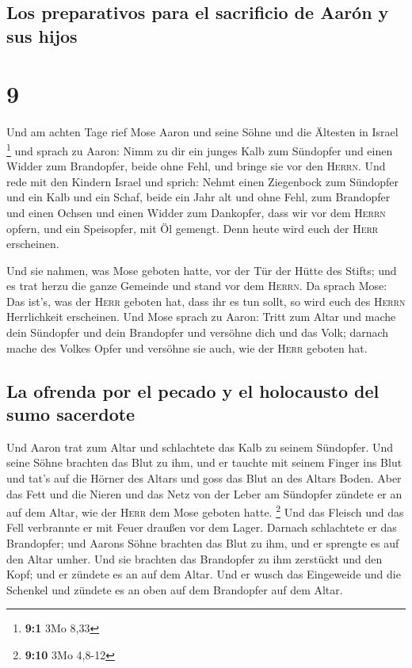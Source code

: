 \hypertarget{los-preparativos-para-el-sacrificio-de-aaruxf3n-y-sus-hijos}{%
\subsection{Los preparativos para el sacrificio de Aarón y sus
hijos}\label{los-preparativos-para-el-sacrificio-de-aaruxf3n-y-sus-hijos}}

\hypertarget{section-8}{%
\section{9}\label{section-8}}

 Und am achten Tage rief Mose Aaron und seine Söhne und
die Ältesten in Israel \footnote{\textbf{9:1} 3Mo 8,33} 
und sprach zu Aaron: Nimm zu dir ein junges Kalb zum Sündopfer und einen
Widder zum Brandopfer, beide ohne Fehl, und bringe sie vor den
\textsc{Herrn}.  Und rede mit den Kindern Israel und
sprich: Nehmt einen Ziegenbock zum Sündopfer und ein Kalb und ein Schaf,
beide ein Jahr alt und ohne Fehl, zum Brandopfer  und
einen Ochsen und einen Widder zum Dankopfer, dass wir vor dem
\textsc{Herrn} opfern, und ein Speisopfer, mit Öl gemengt. Denn heute
wird euch der \textsc{Herr} erscheinen.

 Und sie nahmen, was Mose geboten hatte, vor der Tür der
Hütte des Stifts; und es trat herzu die ganze Gemeinde und stand vor dem
\textsc{Herrn}.  Da sprach Mose: Das ist's, was der
\textsc{Herr} geboten hat, dass ihr es tun sollt, so wird euch des
\textsc{Herrn} Herrlichkeit erscheinen.  Und Mose sprach
zu Aaron: Tritt zum Altar und mache dein Sündopfer und dein Brandopfer
und versöhne dich und das Volk; darnach mache des Volkes Opfer und
versöhne sie auch, wie der \textsc{Herr} geboten hat.

\hypertarget{la-ofrenda-por-el-pecado-y-el-holocausto-del-sumo-sacerdote}{%
\subsection{La ofrenda por el pecado y el holocausto del sumo
sacerdote}\label{la-ofrenda-por-el-pecado-y-el-holocausto-del-sumo-sacerdote}}

 Und Aaron trat zum Altar und schlachtete das Kalb zu
seinem Sündopfer.  Und seine Söhne brachten das Blut zu
ihm, und er tauchte mit seinem Finger ins Blut und tat's auf die Hörner
des Altars und goss das Blut an des Altars Boden.  Aber
das Fett und die Nieren und das Netz von der Leber am Sündopfer zündete
er an auf dem Altar, wie der \textsc{Herr} dem Mose geboten hatte.
\footnote{\textbf{9:10} 3Mo 4,8-12}  Und das Fleisch und
das Fell verbrannte er mit Feuer draußen vor dem Lager. 
Darnach schlachtete er das Brandopfer; und Aarons Söhne brachten das
Blut zu ihm, und er sprengte es auf den Altar umher.  Und
sie brachten das Brandopfer zu ihm zerstückt und den Kopf; und er
zündete es an auf dem Altar.  Und er wusch das Eingeweide
und die Schenkel und zündete es an oben auf dem Brandopfer auf dem
Altar.

